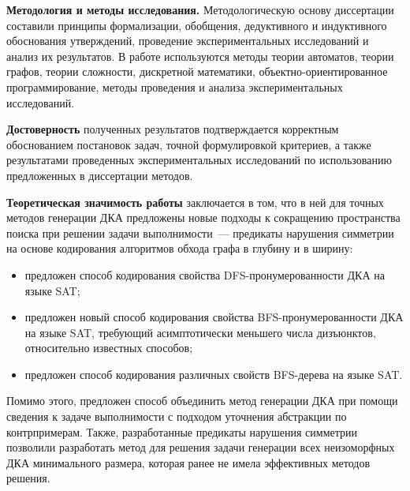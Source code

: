 \textbf{Методология и методы исследования.} 
Методологическую основу диссертации составили принципы формализации, обобщения, дедуктивного и индуктивного обоснования утверждений, проведение экспериментальных исследований и анализ их результатов.
В работе используются методы теории автоматов, теории графов, теории сложности, дискретной математики, объектно-ориентированное программирование, методы проведения и анализа экспериментальных исследований.

\textbf{Достоверность} полученных результатов подтверждается корректным обоснованием постановок задач, точной формулировкой критериев, а также результатами проведенных экспериментальных исследований по использованию предложенных в диссертации методов.

\textbf{Теоретическая значимость работы} заключается в том, что в ней для точных методов генерации ДКА предложены новые подходы к сокращению пространства поиска при решении задачи выполнимости~--- предикаты нарушения симметрии на основе кодирования алгоритмов обхода графа в глубину и в ширину:
\begin{itemize}
  \item предложен способ кодирования свойства DFS-пронумерованности ДКА на языке SAT;
  \item предложен новый способ кодирования свойства BFS-пронумерованности ДКА на языке SAT, требующий асимптотически меньшего числа дизъюнктов, относительно известных способов;
  \item предложен способ кодирования различных свойств BFS-дерева на языке SAT.
\end{itemize}
Помимо этого, предложен способ объединить метод генерации ДКА при помощи сведения к задаче выполнимости с подходом уточнения абстракции по контрпримерам.
Также, разработанные предикаты нарушения симметрии позволили разработать метод для решения задачи генерации всех неизоморфных ДКА минимального размера, которая ранее не имела эффективных методов решения.

